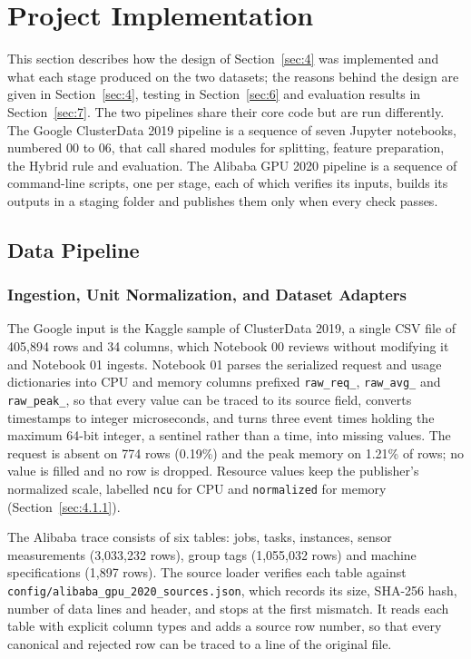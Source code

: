 \section{Project Implementation}\label{sec:5}

This section describes how the design of Section~\ref{sec:4} was implemented and what each stage produced on the two datasets; the reasons behind the design are given in Section~\ref{sec:4}, testing in Section~\ref{sec:6} and evaluation results in Section~\ref{sec:7}. The two pipelines share their core code but are run differently. The Google ClusterData 2019 pipeline \cite{ref7} is a sequence of seven Jupyter notebooks, numbered 00 to 06, that call shared modules for splitting, feature preparation, the Hybrid rule and evaluation. The Alibaba GPU 2020 pipeline \cite{ref19} is a sequence of command-line scripts, one per stage, each of which verifies its inputs, builds its outputs in a staging folder and publishes them only when every check passes.

\subsection{Data Pipeline}\label{sec:5.1}

\subsubsection{Ingestion, Unit Normalization, and Dataset Adapters}\label{sec:5.1.1}

The Google input is the Kaggle sample of ClusterData 2019, a single CSV file of 405,894 rows and 34 columns, which Notebook 00 reviews without modifying it and Notebook 01 ingests. Notebook 01 parses the serialized request and usage dictionaries into CPU and memory columns prefixed \texttt{raw\_req\_}, \texttt{raw\_avg\_} and \texttt{raw\_peak\_}, so that every value can be traced to its source field, converts timestamps to integer microseconds, and turns three event times holding the maximum 64-bit integer, a sentinel rather than a time, into missing values. The request is absent on 774 rows (0.19\%) and the peak memory on 1.21\% of rows; no value is filled and no row is dropped. Resource values keep the publisher's normalized scale, labelled \texttt{ncu} for CPU and \texttt{normalized} for memory (Section~\ref{sec:4.1.1}).

The Alibaba trace consists of six tables: jobs, tasks, instances, sensor measurements (3,033,232 rows), group tags (1,055,032 rows) and machine specifications (1,897 rows). The source loader verifies each table against \texttt{config/alibaba\_gpu\_2020\_sources.json}, which records its size, SHA-256 hash, number of data lines and header, and stops at the first mismatch. It reads each table with explicit column types and adds a source row number, so that every canonical and rejected row can be traced to a line of the original file.

